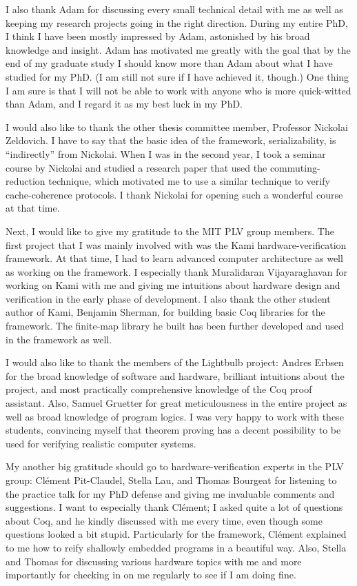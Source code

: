 I also thank Adam for discussing every small technical detail with me as well as keeping my research projects going in the right direction.
During my entire PhD, I think I have been mostly impressed by Adam, astonished by his broad knowledge and insight.
Adam has motivated me greatly with the goal that by the end of my graduate study I should know more than Adam about what I have studied for my PhD.
(I am still not sure if I have achieved it, though.)
One thing I am sure is that I will not be able to work with anyone who is more quick-witted than Adam, and I regard it as my best luck in my PhD.

I would also like to thank the other thesis committee member, Professor Nickolai Zeldovich.
I have to say that the basic idea of the \hemiola{} framework, serializability, is ``indirectly'' from Nickolai.
When I was in the second year, I took a seminar course by Nickolai and studied a research paper that used the commuting-reduction technique, which motivated me to use a similar technique to verify cache-coherence protocols.
I thank Nickolai for opening such a wonderful course at that time.

Next, I would like to give my gratitude to the MIT PLV group members.
The first project that I was mainly involved with was the Kami hardware-verification framework.
At that time, I had to learn advanced computer architecture as well as working on the framework.
I especially thank Muralidaran Vijayaraghavan for working on Kami with me and giving me intuitions about hardware design and verification in the early phase of development.
I also thank the other student author of Kami, Benjamin Sherman, for building basic Coq libraries for the framework.
The finite-map library he built has been further developed and used in the \hemiola{} framework as well.

I would also like to thank the members of the Lightbulb project: Andres Erbsen for the broad knowledge of software and hardware, brilliant intuitions about the project, and most practically comprehensive knowledge of the Coq proof assistant.
Also, Samuel Gruetter for great meticulousness in the entire project as well as broad knowledge of program logics.
I was very happy to work with these students, convincing myself that theorem proving has a decent possibility to be used for verifying realistic computer systems.

My another big gratitude should go to hardware-verification experts in the PLV group: Cl\'ement Pit-Claudel, Stella Lau, and Thomas Bourgeat for listening to the practice talk for my PhD defense and giving me invaluable comments and suggestions.
I want to especially thank Cl\'ement; I asked quite a lot of questions about Coq, and he kindly discussed with me every time, even though some questions looked a bit stupid.
Particularly for the \hemiola{} framework, Cl\'ement explained to me how to reify shallowly embedded programs in a beautiful way.
Also, Stella and Thomas for discussing various hardware topics with me and more importantly for checking in on me regularly to see if I am doing fine.

